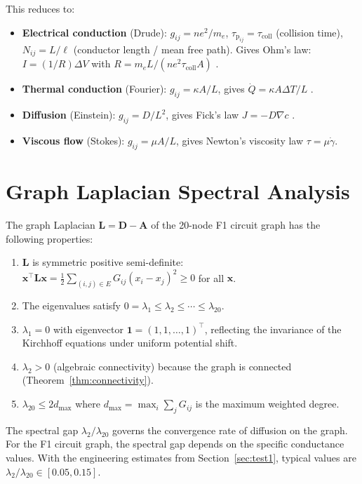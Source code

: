 \documentclass[twocolumn,10pt,a4paper]{article}
\theoremstyle{definition}
\theoremstyle{remark}
\newcommand{\tauP}{\tau_{\mathrm{p}}}
\newcommand{\vect}[1]{\boldsymbol{#1}}
\newcommand{\mat}[1]{\mathbf{#1}}
\begin{document}
This reduces to:
\begin{itemize}
    \item \textbf{Electrical conduction} (Drude): $g_{ij} = ne^2/m_e$, $\tauP_{ij} = \tau_{\mathrm{coll}}$ (collision time), $N_{ij} = L/\ell$ (conductor length / mean free path). Gives Ohm's law: $I = (1/R)\Delta V$ with $R = m_e L / (ne^2 \tau_{\mathrm{coll}} A)$ \citep{Drude1900, Ashcroft1976}.
    \item \textbf{Thermal conduction} (Fourier): $g_{ij} = \kappa A / L$, gives $\dot{Q} = \kappa A \Delta T / L$ \citep{Fourier1822}.
    \item \textbf{Diffusion} (Einstein): $g_{ij} = D/L^2$, gives Fick's law $J = -D \nabla c$ \citep{Einstein1905}.
    \item \textbf{Viscous flow} (Stokes): $g_{ij} = \mu A / L$, gives Newton's viscosity law $\tau = \mu \dot{\gamma}$.
\end{itemize}


\section{Graph Laplacian Spectral Analysis}\label{app:spectral}

The graph Laplacian $\mat{L} = \mat{D} - \mat{A}$ of the 20-node F1 circuit graph has the following properties:

\begin{enumerate}
    \item $\mat{L}$ is symmetric positive semi-definite: $\vect{x}^\top \mat{L} \vect{x} = \frac{1}{2}\sum_{(i,j) \in E} G_{ij}(x_i - x_j)^2 \geq 0$ for all $\vect{x}$.
    \item The eigenvalues satisfy $0 = \lambda_1 \leq \lambda_2 \leq \cdots \leq \lambda_{20}$.
    \item $\lambda_1 = 0$ with eigenvector $\vect{1} = (1, 1, \ldots, 1)^\top$, reflecting the invariance of the Kirchhoff equations under uniform potential shift.
    \item $\lambda_2 > 0$ (algebraic connectivity) because the graph is connected (Theorem~\ref{thm:connectivity}).
    \item $\lambda_{20} \leq 2 d_{\max}$ where $d_{\max} = \max_i \sum_j G_{ij}$ is the maximum weighted degree.
\end{enumerate}

The spectral gap $\lambda_2 / \lambda_{20}$ governs the convergence rate of diffusion on the graph. For the F1 circuit graph, the spectral gap depends on the specific conductance values. With the engineering estimates from Section~\ref{sec:test1}, typical values are $\lambda_2 / \lambda_{20} \in [0.05, 0.15]$.
\end{document}
